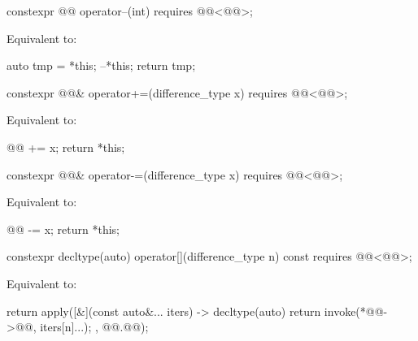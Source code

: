 \begin{itemdecl}
constexpr @@ operator--(int) requires @@<@@>;
\end{itemdecl}

\begin{itemdescr}
\pnum
\effects
Equivalent to:
\begin{codeblock}
auto tmp = *this;
--*this;
return tmp;
\end{codeblock}
\end{itemdescr}

\begin{itemdecl}
constexpr @@& operator+=(difference_type x) requires @@<@@>;
\end{itemdecl}

\begin{itemdescr}
\pnum
\effects
Equivalent to:
\begin{codeblock}
@@ += x;
return *this;
\end{codeblock}
\end{itemdescr}

\begin{itemdecl}
constexpr @@& operator-=(difference_type x) requires @@<@@>;
\end{itemdecl}

\begin{itemdescr}
\pnum
\effects
Equivalent to:
\begin{codeblock}
@@ -= x;
return *this;
\end{codeblock}
\end{itemdescr}

\begin{itemdecl}
constexpr decltype(auto) operator[](difference_type n) const
  requires @@<@@>;
\end{itemdecl}

\begin{itemdescr}
\pnum
\effects
Equivalent to:
\begin{codeblock}
return apply([&](const auto&... iters) -> decltype(auto) {
  return invoke(*@@->@@, iters[n]...);
}, @@.@@);
\end{codeblock}
\end{itemdescr}

